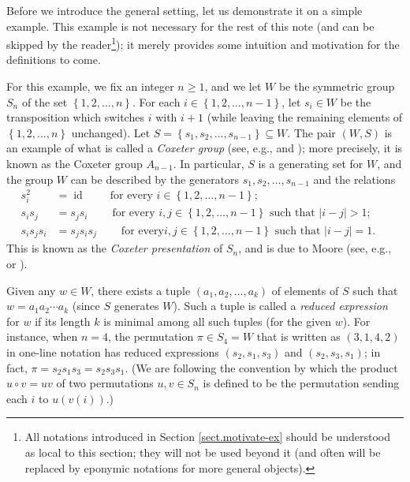 \documentclass
[numbers=enddot,12pt,final,onecolumn,notitlepage,abstracton]{scrartcl}%
\theoremstyle{definition}
\newtheorem{exmp}[theo]{Example}
\newenvironment{example}[1][]
{\begin{exmp}[#1]\begin{leftbar}}
{\end{leftbar}\end{exmp}}
\begin{document}
Before we introduce the general setting, let us demonstrate it on a simple
example. This example is not necessary for the rest of this note (and can be
skipped by the reader\footnote{All notations introduced in Section
\ref{sect.motivate-ex} should be understood as local to this section; they
will not be used beyond it (and often will be replaced by eponymic notations
for more general objects).}); it merely provides some intuition and motivation
for the definitions to come.

For this example, we fix an integer $n\geq1$, and we let $W$ be the symmetric
group $S_{n}$ of the set $\left\{  1,2,\ldots,n\right\}  $. For each
$i\in\left\{  1,2,\ldots,n-1\right\}  $, let $s_{i}\in W$ be the transposition
which switches $i$ with $i+1$ (while leaving the remaining elements of
$\left\{  1,2,\ldots,n\right\}  $ unchanged). Let $S=\left\{  s_{1}%
,s_{2},\ldots,s_{n-1}\right\}  \subseteq W$. The pair $\left(  W,S\right)  $
is an example of what is called a \emph{Coxeter group} (see, e.g.,
\cite[Chapter 4]{Bourbaki4-6} and \cite[\S 1]{Lusztig-Hecke}); more precisely,
it is known as the Coxeter group $A_{n-1}$. In particular, $S$ is a generating
set for $W$, and the group $W$ can be described by the generators $s_{1}%
,s_{2},\ldots,s_{n-1}$ and the relations%
\begin{align}
s_{i}^{2}  &  =\operatorname*{id}\ \ \ \ \ \ \ \ \ \ \text{for every }%
i\in\left\{  1,2,\ldots,n-1\right\}
;\ \ \ \ \ \ \ \ \ \ \label{eq.exam.A3.quad}\\
s_{i}s_{j}  &  =s_{j}s_{i}\ \ \ \ \ \ \ \ \ \ \text{for every }i,j\in\left\{
1,2,\ldots,n-1\right\}  \text{ such that }\left\vert i-j\right\vert
>1;\ \ \ \ \ \ \ \label{eq.exam.A3.braid1}\\
s_{i}s_{j}s_{i}  &  =s_{j}s_{i}s_{j}\ \ \ \ \ \ \ \ \ \ \text{for every
}i,j\in\left\{  1,2,\ldots,n-1\right\}  \text{ such that }\left\vert
i-j\right\vert =1.\ \ \ \ \ \label{eq.exam.A3.braid2}%
\end{align}
This is known as the \emph{Coxeter presentation} of $S_{n}$, and is due to
Moore (see, e.g., \cite[(6.23)--(6.25)]{CoxMos80} or \cite[Theorem
1.2.4]{Williamson}).

Given any $w\in W$, there exists a tuple $\left(  a_{1},a_{2},\ldots
,a_{k}\right)  $ of elements of $S$ such that $w=a_{1}a_{2}\cdots a_{k}$
(since $S$ generates $W$). Such a tuple is called a \emph{reduced expression}
for $w$ if its length $k$ is minimal among all such tuples (for the given
$w$). For instance, when $n=4$, the permutation $\pi\in S_{4}=W$ that is
written as $\left(  3,1,4,2\right)  $ in one-line notation has reduced
expressions $\left(  s_{2},s_{1},s_{3}\right)  $ and $\left(  s_{2}%
,s_{3},s_{1}\right)  $; in fact, $\pi=s_{2}s_{1}s_{3}=s_{2}s_{3}s_{1}$. (We
are following the convention by which the product $u\circ v=uv$ of two
permutations $u,v\in S_{n}$ is defined to be the permutation sending each $i$
to $u\left(  v\left(  i\right)  \right)  $.)
\end{document}
